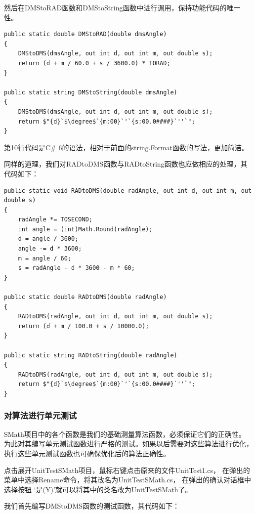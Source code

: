 然后在DMStoRAD函数和DMStoString函数中进行调用，保持功能代码的唯一性。

\begin{lstlisting}
public static double DMStoRAD(double dmsAngle)
{
    DMStoDMS(dmsAngle, out int d, out int m, out double s);
    return (d + m / 60.0 + s / 3600.0) * TORAD;
}

public static string DMStoString(double dmsAngle)
{
    DMStoDMS(dmsAngle, out int d, out int m, out double s);
    return $"{d}`$\degree$`{m:00}`'`{s:00.0####}`''`";
}
\end{lstlisting}

第10行代码是C\# 6的语法，相对于前面的string.Format函数的写法，更加简洁。

同样的道理，我们对RADtoDMS函数与RADtoString函数也应做相应的处理，其代码如下：
\begin{lstlisting}
public static void RADtoDMS(double radAngle, out int d, out int m, out double s)
{
    radAngle *= TOSECOND;
    int angle = (int)Math.Round(radAngle);
    d = angle / 3600;
    angle -= d * 3600;
    m = angle / 60;
    s = radAngle - d * 3600 - m * 60;
}

public static double RADtoDMS(double radAngle)
{
    RADtoDMS(radAngle, out int d, out int m, out double s);
    return (d + m / 100.0 + s / 10000.0);
}

public static string RADtoString(double radAngle)
{
    RADtoDMS(radAngle, out int d, out int m, out double s);
    return $"{d}`$\degree$`{m:00}`'`{s:00.0####}`''`";
}
\end{lstlisting}



\subsubsection{对算法进行单元测试}

SMath项目中的各个函数是我们的基础测量算法函数，必须保证它们的正确性。
为此对其编写单元测试函数进行严格的测试。如果以后需要对这些算法进行优化，
执行这些单元测试函数也可确保优化后的算法正确性。

点击展开UnitTestSMath项目，鼠标右键点击原来的文件UnitTest1.cs，
在弹出的菜单中选择Rename命令，将其改名为UnitTestSMath.cs，
在弹出的确认对话框中选择按钮 `是(Y)'就可以将其中的类名改为UnitTestSMath了。

我们首先编写DMStoDMS函数的测试函数，其代码如下：

